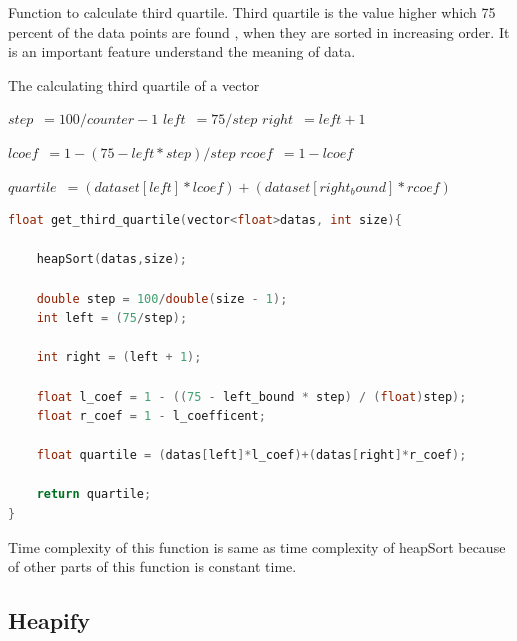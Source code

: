 \documentclass[a4paper, 12pt, titlepage]{article}
\begin{document}
    Function to calculate third quartile. Third quartile is the value higher which 75 percent of the data points are found , when they are sorted in increasing order. It is an important feature understand the meaning of data. 
\begin{algorithm}[H]
	\caption{The calculating third quartile of a vector}
	\label{algo:dfs}
	\begin{algorithmic}

		
            \State{}

            \State $step$\ {$ = 100/counter-1$} 
            \State $left$\ {$ = 75/step$}
            \State $right$\ {$ = left + 1$}

            \State $lcoef$\ {$ = 1 - (75 - left * step) / step$} 
            \State $rcoef$\ {$ = 1 - lcoef$} 

            \State $quartile$\ {$ = (dataset[left] * lcoef) + (dataset[right_bound] * rcoef)$} 

	\EndFunction
	\end{algorithmic}
\end{algorithm}
    
\usepackage{\textbf{Code for Get Third Quartile}}
\begin{lstlisting}[language=C++]
float get_third_quartile(vector<float>datas, int size){             

    heapSort(datas,size);                                          

    double step = 100/double(size - 1);                             
    int left = (75/step);                                     

    int right = (left + 1);                             

    float l_coef = 1 - ((75 - left_bound * step) / (float)step);      
    float r_coef = 1 - l_coefficent;                                  

    float quartile = (datas[left]*l_coef)+(datas[right]*r_coef);  

    return quartile;
}
\end{lstlisting}
Time complexity of this function is same as time complexity of heapSort because of other parts of this function is constant time.

\newpage

\subsection{Heapify}
\end{document}
